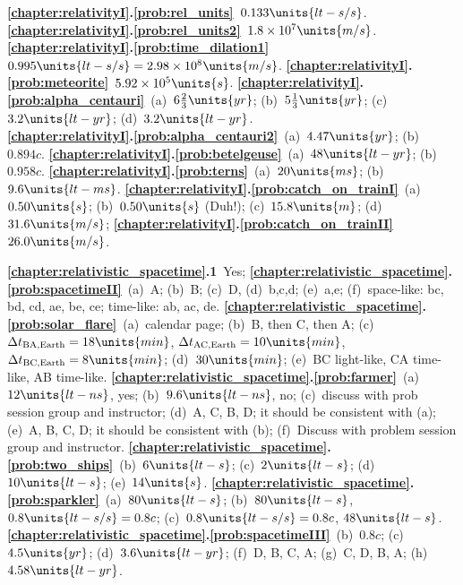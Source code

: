 
\noindent 
{\bf \ref{chapter:relativityI}.\ref{prob:rel_units}}~$0.133\units{lt-s/s}$.  
{\bf \ref{chapter:relativityI}.\ref{prob:rel_units2}}~$1.8\times 10^7\units{m/s}$.  
{\bf \ref{chapter:relativityI}.\ref{prob:time_dilation1}}~$0.995\units{lt-s/s} 
= 2.98\times 10^8\units{m/s}$.  
{\bf \ref{chapter:relativityI}.\ref{prob:meteorite}}~$5.92\times 10^5\units{s}$.
{\bf \ref{chapter:relativityI}.\ref{prob:alpha_centauri}}~(a)~$6\frac{2}{3}
\units{yr}$; (b)~$5\frac{1}{3}\units{yr}$; 
(c)~$3.2\units{lt-yr}$; (d)~$3.2\units{lt-yr}$.\\ 
{\bf \ref{chapter:relativityI}.\ref{prob:alpha_centauri2}}~(a)~$4.47\units{yr}$; 
(b)~$0.894c$. 
{\bf \ref{chapter:relativityI}.\ref{prob:betelgeuse}}~(a)~$48\units{lt-yr}$; 
(b)~$0.958c$.
{\bf \ref{chapter:relativityI}.\ref{prob:terns}}~(a)~$20\units{ms}$; 
(b)~$9.6\units{lt-ms}$. 
{\bf \ref{chapter:relativityI}.\ref{prob:catch_on_trainI}}~(a)~$0.50\units{s}$;
(b)~$0.50\units{s}$ (Duh!); (c)~$15.8\units{m}$; (d)~$31.6\units{m/s}$;
{\bf \ref{chapter:relativityI}.\ref{prob:catch_on_trainII}}~$26.0\units{m/s}$.
\medskip


\noindent
{\bf \ref{chapter:relativistic_spacetime}.1}~Yes;
{\bf \ref{chapter:relativistic_spacetime}.\ref{prob:spacetimeII}}~(a)~A; 
(b)~B; (c)~D, (d)~b,c,d; (e)~a,e; (f)~space-like: bc, bd, cd, ae, be, ce; 
time-like: ab, ac, de.
{\bf \ref{chapter:relativistic_spacetime}.\ref{prob:solar_flare}}~(a)~calendar 
page; (b)~B, then C, then A; (c)~$\Delta t_{\rm BA,Earth} = 18\units{min}$, 
$\Delta t_{\rm AC,Earth} = 10\units{min}$, $\Delta t_{\rm BC,Earth} = 
8\units{min}$; 
(d)~$30\units{min}$; 
(e)~BC light-like, CA time-like, AB time-like. 
{\bf \ref{chapter:relativistic_spacetime}.\ref{prob:farmer}}~(a)~$12\units{lt-ns}$, yes;
(b)~$9.6\units{lt-ns}$, no; (c)~discuss with prob session group and instructor; 
(d)~A, C, B, D; it should be consistent with (a);
(e)~A, B, C, D; it should be consistent with (b);
(f)~Discuss with problem session group and instructor.
{\bf \ref{chapter:relativistic_spacetime}.\ref{prob:two_ships}}~(b)~$6\units{lt-s}$; (c)~$2\units{lt-s}$; (d)~$10\units{lt-s}$;
(e)~$14\units{s}$.
{\bf \ref{chapter:relativistic_spacetime}.\ref{prob:sparkler}}~(a)~$80\units{lt-s}$; 
(b)~$80\units{lt-s}$, $0.8\units{lt-s/s}=0.8c$; 
(c)~$0.8\units{lt-s/s}=0.8c$, $48\units{lt-s}$.
{\bf \ref{chapter:relativistic_spacetime}.\ref{prob:spacetimeIII}}~(b)~$0.8c$; 
(c)~$4.5\units{yr}$; 
(d)~$3.6\units{lt-yr}$; (f)~D, B, C, A; (g)~C, D, B, A; 
(h)~$4.58\units{lt-yr}$.
\medskip


